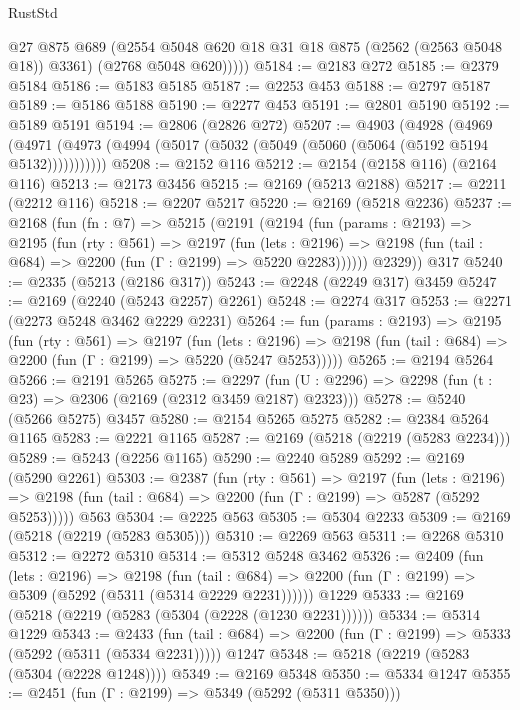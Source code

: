 \begin{lexlean}{RustStd}
\begin{coremodule}
            @27
            @875
            @689
            (@2554 @5048 @620 @18 @31 @18 @875 (@2562 (@2563 @5048 @18)) @3361)
            (@2768 @5048 @620)))))
@5184 := @2183 @272
@5185 := @2379 @5184
@5186 := @5183 @5185
@5187 := @2253 @453
@5188 := @2797 @5187
@5189 := @5186 @5188
@5190 := @2277 @453
@5191 := @2801 @5190
@5192 := @5189 @5191
@5194 := @2806 (@2826 @272)
@5207 := @4903
    (@4928
      (@4969 (@4971 (@4973 (@4994 (@5017 (@5032 (@5049 (@5060 (@5064 (@5192 @5194 @5132)))))))))))
@5208 := @2152 @116
@5212 := @2154 (@2158 @116) (@2164 @116)
@5213 := @2173 @3456
@5215 := @2169 (@5213 @2188)
@5217 := @2211 (@2212 @116)
@5218 := @2207 @5217
@5220 := @2169 (@5218 @2236)
@5237 := @2168
    (fun (fn : @7) =>
    @5215
      (@2191
        (@2194
          (fun (params : @2193) =>
          @2195
            (fun (rty : @561) =>
            @2197
              (fun (lets : @2196) =>
              @2198 (fun (tail : @684) => @2200 (fun (Γ : @2199) => @5220 @2283))))))
        @2329))
    @317
@5240 := @2335 (@5213 (@2186 @317))
@5243 := @2248 (@2249 @317) @3459
@5247 := @2169 (@2240 (@5243 @2257) @2261)
@5248 := @2274 @317
@5253 := @2271 (@2273 @5248 @3462 @2229 @2231)
@5264 := fun (params : @2193) =>
  @2195
    (fun (rty : @561) =>
    @2197
      (fun (lets : @2196) =>
      @2198 (fun (tail : @684) => @2200 (fun (Γ : @2199) => @5220 (@5247 @5253)))))
@5265 := @2194 @5264
@5266 := @2191 @5265
@5275 := @2297 (fun (U : @2296) => @2298 (fun (t : @23) => @2306 (@2169 (@2312 @3459 @2187) @2323)))
@5278 := @5240 (@5266 @5275) @3457
@5280 := @2154 @5265 @5275
@5282 := @2384 @5264 @1165
@5283 := @2221 @1165
@5287 := @2169 (@5218 (@2219 (@5283 @2234)))
@5289 := @5243 (@2256 @1165)
@5290 := @2240 @5289
@5292 := @2169 (@5290 @2261)
@5303 := @2387
    (fun (rty : @561) =>
    @2197
      (fun (lets : @2196) =>
      @2198 (fun (tail : @684) => @2200 (fun (Γ : @2199) => @5287 (@5292 @5253)))))
    @563
@5304 := @2225 @563
@5305 := @5304 @2233
@5309 := @2169 (@5218 (@2219 (@5283 @5305)))
@5310 := @2269 @563
@5311 := @2268 @5310
@5312 := @2272 @5310
@5314 := @5312 @5248 @3462
@5326 := @2409
    (fun (lets : @2196) =>
    @2198
      (fun (tail : @684) => @2200 (fun (Γ : @2199) => @5309 (@5292 (@5311 (@5314 @2229 @2231))))))
    @1229
@5333 := @2169 (@5218 (@2219 (@5283 (@5304 (@2228 (@1230 @2231))))))
@5334 := @5314 @1229
@5343 := @2433
    (fun (tail : @684) => @2200 (fun (Γ : @2199) => @5333 (@5292 (@5311 (@5334 @2231)))))
    @1247
@5348 := @5218 (@2219 (@5283 (@5304 (@2228 @1248))))
@5349 := @2169 @5348
@5350 := @5334 @1247
@5355 := @2451 (fun (Γ : @2199) => @5349 (@5292 (@5311 @5350)))

\end{coremodule}
\end{lexlean}
